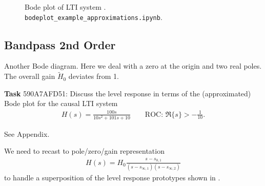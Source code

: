 \begin{figure}[h!]
\centering
{}

\caption{Bode plot of LTI system .
\texttt{bodeplot\_example\_approximations.ipynb}.}
\label{fig:bodeplot_example_approximations_44EB4169E9}
\end{figure}





\clearpage
\subsection{Bandpass 2nd Order}
\label{sec:590A7AFD51}
\begin{Ziel}
Another Bode diagram. Here we deal with a zero at the origin and two real
poles. The overall gain $\tilde{H}_0$ deviates from 1.
\end{Ziel}
\textbf{Task} {\tiny 590A7AFD51}: Discuss the level response in terms
of the (approximated) Bode plot for the causal LTI system
\begin{align}
H(s) = \frac{100 s}{10 s^2 + 101 s + 10}\qquad\text{ROC: }
\Re\{s\}>-\frac{1}{10}.
\end{align}
\begin{Werkzeug}
See Appendix.
\end{Werkzeug}
\begin{Ansatz}
We need to recast to pole/zero/gain representation
\begin{align}
H(s) = H_0\frac{s-s_{0,1}}{(s-s_{\infty,1})(s-s_{\infty,2})}
\end{align}
to handle a superposition of the level response prototypes shown in
.
\end{Ansatz}

